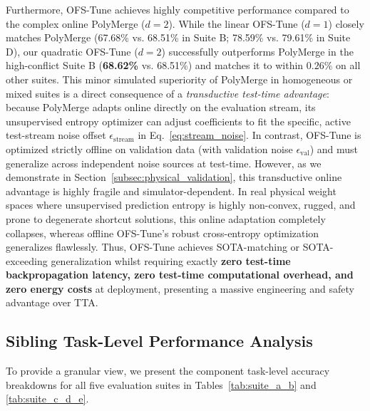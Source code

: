 Furthermore, OFS-Tune achieves highly competitive performance compared to the complex online PolyMerge ($d=2$).
While the linear OFS-Tune ($d=1$) closely matches PolyMerge (67.68\% vs.
68.51\% in Suite B; 78.59\% vs.
79.61\% in Suite D), our quadratic OFS-Tune ($d=2$) successfully outperforms PolyMerge in the high-conflict Suite B (\textbf{68.62\%} vs.
68.51\%) and matches it to within $0.26\%$ on all other suites.
This minor simulated superiority of PolyMerge in homogeneous or mixed suites is a direct consequence of a \emph{transductive test-time advantage}: because PolyMerge adapts online directly on the evaluation stream, its unsupervised entropy optimizer can adjust coefficients to fit the specific, active test-stream noise offset $\epsilon_{\text{stream}}$ in Eq.~\ref{eq:stream_noise}.
In contrast, OFS-Tune is optimized strictly offline on validation data (with validation noise $\epsilon_{\text{val}}$) and must generalize across independent noise sources at test-time.
However, as we demonstrate in Section~\ref{subsec:physical_validation}, this transductive online advantage is highly fragile and simulator-dependent.
In real physical weight spaces where unsupervised prediction entropy is highly non-convex, rugged, and prone to degenerate shortcut solutions, this online adaptation completely collapses, whereas offline OFS-Tune's robust cross-entropy optimization generalizes flawlessly.
Thus, OFS-Tune achieves SOTA-matching or SOTA-exceeding generalization whilst requiring exactly \textbf{zero test-time backpropagation latency, zero test-time computational overhead, and zero energy costs} at deployment, presenting a massive engineering and safety advantage over TTA.

\subsection{Sibling Task-Level Performance Analysis}
To provide a granular view, we present the component task-level accuracy breakdowns for all five evaluation suites in Tables~\ref{tab:suite_a_b} and \ref{tab:suite_c_d_e}.

